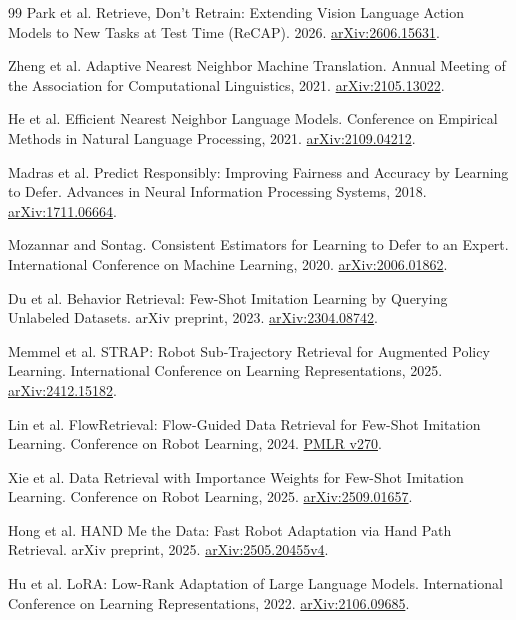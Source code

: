 \documentclass[10pt,twocolumn,letterpaper]{article}
\begin{document}
{\begin{thebibliography}{99}
Park et al. Retrieve, Don't Retrain: Extending Vision Language Action Models to New Tasks at Test Time (ReCAP). 2026. \href{https://arxiv.org/abs/2606.15631}{arXiv:2606.15631}.

Zheng et al. Adaptive Nearest Neighbor Machine Translation. Annual Meeting of the Association for Computational Linguistics, 2021. \href{https://arxiv.org/abs/2105.13022}{arXiv:2105.13022}.

He et al. Efficient Nearest Neighbor Language Models. Conference on Empirical Methods in Natural Language Processing, 2021. \href{https://arxiv.org/abs/2109.04212}{arXiv:2109.04212}.

Madras et al. Predict Responsibly: Improving Fairness and Accuracy by Learning to Defer. Advances in Neural Information Processing Systems, 2018. \href{https://arxiv.org/abs/1711.06664}{arXiv:1711.06664}.

Mozannar and Sontag. Consistent Estimators for Learning to Defer to an Expert. International Conference on Machine Learning, 2020. \href{https://arxiv.org/abs/2006.01862}{arXiv:2006.01862}.

Du et al. Behavior Retrieval: Few-Shot Imitation Learning by Querying Unlabeled Datasets. arXiv preprint, 2023. \href{https://arxiv.org/abs/2304.08742}{arXiv:2304.08742}.

Memmel et al. STRAP: Robot Sub-Trajectory Retrieval for Augmented Policy Learning. International Conference on Learning Representations, 2025. \href{https://arxiv.org/abs/2412.15182}{arXiv:2412.15182}.

Lin et al. FlowRetrieval: Flow-Guided Data Retrieval for Few-Shot Imitation Learning. Conference on Robot Learning, 2024. \href{https://proceedings.mlr.press/v270/lin25a.html}{PMLR v270}.

Xie et al. Data Retrieval with Importance Weights for Few-Shot Imitation Learning. Conference on Robot Learning, 2025. \href{https://arxiv.org/abs/2509.01657v1}{arXiv:2509.01657}.

Hong et al. HAND Me the Data: Fast Robot Adaptation via Hand Path Retrieval. arXiv preprint, 2025. \href{https://arxiv.org/abs/2505.20455v4}{arXiv:2505.20455v4}.

Hu et al. LoRA: Low-Rank Adaptation of Large Language Models. International Conference on Learning Representations, 2022. \href{https://arxiv.org/abs/2106.09685}{arXiv:2106.09685}.


\end{thebibliography}}
\end{document}
